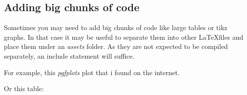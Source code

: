 \documentclass[../../../main.tex]{subfiles}
\begin{document}
\subsection{Adding big chunks of code}
Sometimes you may need to add big chunks of code like large tables or tikz graphs. In that case it may be useful to separate them into other \LaTeX files and place them under an \textit{assets} folder. As they are not expected to be compiled separately, an include statement will suffice.

For example, this \textit{pgfplots} plot that i found on the internet.



Or this table:


\end{document}
